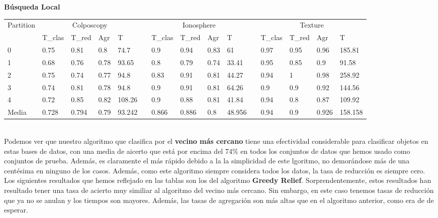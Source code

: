 \documentclass[11pt]{article}
\begin{document}
\textbf{Búsqueda Local}\\

\hspace{-1.3cm}\begin{tabular}{lllllllllllllll}
Partition & \multicolumn{4}{c}{Colposcopy}   &  & \multicolumn{4}{c}{Ionosphere}   &  & \multicolumn{4}{c}{Texture}        \\
          & T\_clas & T\_red & Agr  & T      &  & T\_clas & T\_red & Agr  & T      &  & T\_clas & T\_red & Agr   & T       \\
0         & 0.75    & 0.81   & 0.8  & 74.7   &  & 0.9     & 0.94   & 0.83 & 61     &  & 0.97    & 0.95   & 0.96  & 185.81  \\
1         & 0.68    & 0.76   & 0.78 & 93.65  &  & 0.8     & 0.79   & 0.74 & 33.41  &  & 0.95    & 0.85   & 0.9   & 91.58   \\
2         & 0.75    & 0.74   & 0.77 & 94.8   &  & 0.83    & 0.91   & 0.81 & 44.27  &  & 0.94    & 1      & 0.98  & 258.92  \\
3         & 0.74    & 0.81   & 0.78 & 94.8   &  & 0.9     & 0.91   & 0.81 & 64.26  &  & 0.9     & 0.9    & 0.92  & 144.56  \\
4         & 0.72    & 0.85   & 0.82 & 108.26 &  & 0.9     & 0.88   & 0.81 & 41.84  &  & 0.94    & 0.8    & 0.87  & 109.92  \\
Media     & 0.728   & 0.794  & 0.79 & 93.242 &  & 0.866   & 0.886  & 0.8  & 48.956 &  & 0.94    & 0.9    & 0.926 & 158.158
\end{tabular}\\

Podemos ver que nuestro algoritmo que clasifica por el \textbf{vecino más cercano} tiene una efectividad considerable para clasificar objetos en estas bases de datos, con una media de aicerto que está por encima del 74\% en todos los conjuntos de datos que hemos usado como conjuntos de prueba. Además, es claramente el más rápido debido a la la simplicidad de este lgoritmo, no demorándose más de una centésima en ninguno de los casos. Además, como este algoritmo siempre considera todos los datos, la tasa de reducción es siempre cero. \\

Los siguientes resultados que hemos reflejado en las tablas son los del algoritmo \textbf{Greedy Relief}. Sorprendentemente, estos resultados han resultado tener una tasa de acierto muy similiar al algoritmo del vecino más cercano. Sin embargo, en este caso tenemos tasas de reducción que ya no se anulan y los tiempos son mayores. Además, las tasas de agregación son más altas que en el algoritmo anterior, como era de de esperar.
\end{document}
